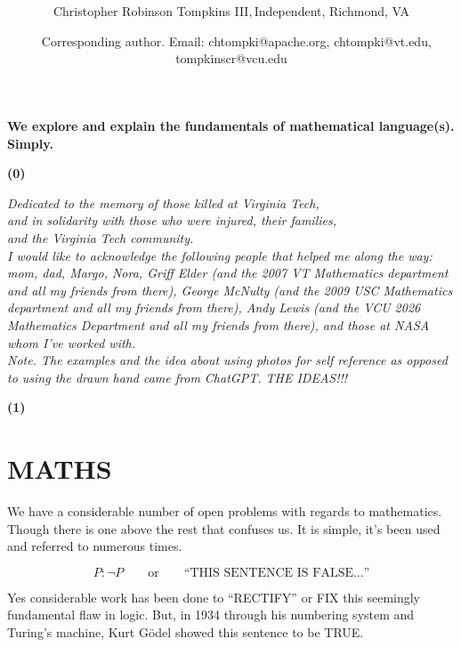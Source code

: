 \documentclass[12pt]{article}
\date{}
\title{\bfseries \boldmath \scititle}
\author{
    Christopher Robinson Tompkins III$,
    $Independent, Richmond, VA\and\
%
    Corresponding author. Email: chtompki@apache.org, chtompki@vt.edu, tompkinscr@vcu.edu
}
\renewenvironment{abstract}
{\quotation}
{\endquotation}
\begin{document}
    \maketitle

    \begin{abstract} \bfseries \boldmath
        We explore and explain the fundamentals of mathematical language(s). Simply.
    \end{abstract}


    \textbf{(0)}
    \begin{center}
        \emph{Dedicated to the memory of those killed at Virginia Tech,\\
        and in solidarity with those who were injured, their families,\\
        and the Virginia Tech community.}
        \qquad\\
        \emph{I would like to acknowledge the following people that helped me along the way: mom, dad, Margo, Nora,
            Griff Elder (and the 2007 VT Mathematics department and all my friends from there), George McNulty (and the 2009 USC Mathematics department and all my friends from there),
            Andy Lewis (and the VCU 2026 Mathematics Department and all my friends from there), and those at NASA whom I've worked with.}
        \qquad\\
        \emph{Note. The examples and the idea about using photos for self reference as opposed to using the drawn
        hand came from ChatGPT. THE IDEAS!!!}
    \end{center}

    \textbf{(1)}
    \section*{MATHS}

    We have a considerable number of open problems with regards to mathematics.
    Though there is one above the rest that confuses us. It is simple, it's been
    used and referred to numerous times.

    \[
        P:\neg P
        \qquad\text{or}\qquad
        \text{``THIS SENTENCE IS FALSE\ldots''}
    \]

    Yes considerable work has been done to ``RECTIFY'' or FIX this seemingly
    fundamental flaw in logic. But, in 1934 through his numbering system and
    Turing's machine, Kurt G\"odel showed this sentence to be TRUE.
\end{document}
